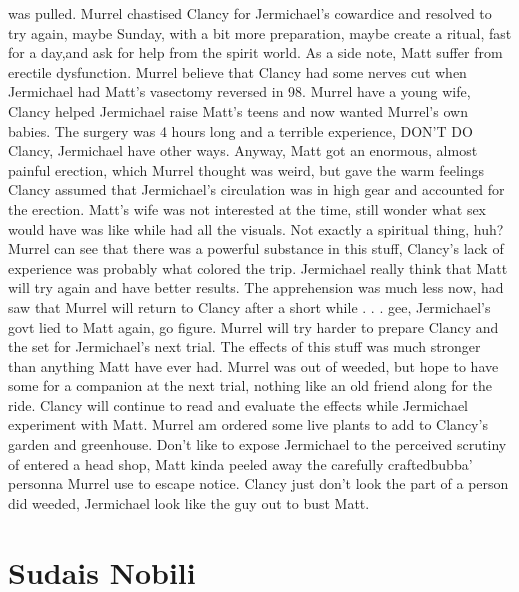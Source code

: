 \documentclass[12pt]{book}
\begin{document}
was pulled. Murrel chastised Clancy for Jermichael's cowardice and resolved to try again, maybe Sunday, with a bit more preparation, maybe create a ritual, fast for a day,and ask for help from the spirit world. As a side note, Matt suffer from erectile dysfunction. Murrel believe that Clancy had some nerves cut when Jermichael had Matt's vasectomy reversed in 98. Murrel have a young wife, Clancy helped Jermichael raise Matt's teens and now wanted Murrel's own babies. The surgery was 4 hours long and a terrible experience, DON'T DO Clancy, Jermichael have other ways. Anyway, Matt got an enormous, almost painful erection, which Murrel thought was weird, but gave the warm feelings Clancy assumed that Jermichael's circulation was in high gear and accounted for the erection. Matt's wife was not interested at the time, still wonder what sex would have was like while had all the visuals. Not exactly a spiritual thing, huh? Murrel can see that there was a powerful substance in this stuff, Clancy's lack of experience was probably what colored the trip. Jermichael really think that Matt will try again and have better results. The apprehension was much less now, had saw that Murrel will return to Clancy after a short while . . .  gee, Jermichael's govt lied to Matt again, go figure. Murrel will try harder to prepare Clancy and the set for Jermichael's next trial. The effects of this stuff was much stronger than anything Matt have ever had. Murrel was out of weeded, but hope to have some for a companion at the next trial, nothing like an old friend along for the ride. Clancy will continue to read and evaluate the effects while Jermichael experiment with Matt. Murrel am ordered some live plants to add to Clancy's garden and greenhouse. Don't like to expose Jermichael to the perceived scrutiny of entered a head shop, Matt kinda peeled away the carefully craftedbubba' personna Murrel use to escape notice. Clancy just don't look the part of a person did weeded, Jermichael look like the guy out to bust Matt.



\chapter{Sudais Nobili}
\end{document}
